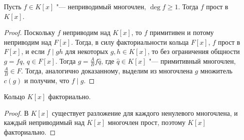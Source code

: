 \begin{corollary}
	Пусть $f \in K[x]$ "--- неприводимый многочлен, $\deg{f} \ge 1$. Тогда $f$ прост в $K[x]$.
\end{corollary}

\begin{proof}
	Поскольку $f$ неприводим над $K[x]$, то $f$ примитивен и потому неприводим над $F[x]$. Тогда, в силу факториальности кольца $F[x]$, $f$ прост в $F[x]$, и если $f \mid gh$ для некоторых $g, h \in K[x]$, то без ограничения общности $g = fq$, $q \in F[x]$. Тогда $g = \frac{A}{B}f\widehat{q}$, где $\widehat{q} \in K[x]$ "--- примитивный многочлен, $\frac{A}{B} \in F$. Тогда, аналогично доказанному, выделим из многочлена $g$ множитель $c(g)$ и получим, что $f \mid g$.
\end{proof}

\begin{theorem}
	Кольцо $K[x]$ факториально.
\end{theorem}

\begin{proof}
	В $K[x]$ существует разложение для каждого ненулевого многочлена, и каждый неприводимый над $K[x]$ многочлен прост, поэтому $K[x]$ факториально.
\end{proof}